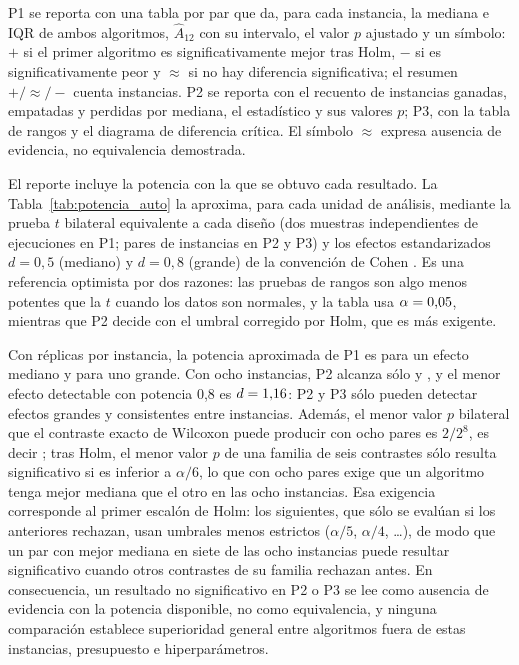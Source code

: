 P1 se reporta con una tabla por par que da, para cada instancia, la mediana e IQR de ambos algoritmos, $\hat{A}_{12}$ con su intervalo, el valor $p$ ajustado y un símbolo: $+$ si el primer algoritmo es significativamente mejor tras Holm, $-$ si es significativamente peor y $\approx$ si no hay diferencia significativa; el resumen $+/\approx/-$ cuenta instancias. P2 se reporta con el recuento de instancias ganadas, empatadas y perdidas por mediana, el estadístico y sus valores $p$; P3, con la tabla de rangos y el diagrama de diferencia crítica. El símbolo $\approx$ expresa ausencia de evidencia, no equivalencia demostrada.

El reporte incluye la potencia con la que se obtuvo cada resultado. La Tabla~\ref{tab:potencia_auto} la aproxima, para cada unidad de análisis, mediante la prueba $t$ bilateral equivalente a cada diseño (dos muestras independientes de \Replicates{} ejecuciones en P1; pares de instancias en P2 y P3) y los efectos estandarizados $d=0{,}5$ (mediano) y $d=0{,}8$ (grande) de la convención de Cohen \cite{Cohen1988Power}. Es una referencia optimista por dos razones: las pruebas de rangos son algo menos potentes que la $t$ cuando los datos son normales, y la tabla usa $\alpha=\text{0,05}$, mientras que P2 decide con el umbral corregido por Holm, que es más exigente.

\TablaPotenciaAuto

Con \Replicates{} réplicas por instancia, la potencia aproximada de P1 es \PowerReplicatesMedium{} para un efecto mediano y \PowerReplicatesLarge{} para uno grande. Con ocho instancias, P2 alcanza sólo \PowerInstancesMedium{} y \PowerInstancesLarge, y el menor efecto detectable con potencia 0,8 es $d=\text{1,16}$: P2 y P3 sólo pueden detectar efectos grandes y consistentes entre instancias. Además, el menor valor $p$ bilateral que el contraste exacto de Wilcoxon puede producir con ocho pares es $2/2^8$, es decir \WilcoxonMinP; tras Holm, el menor valor $p$ de una familia de seis contrastes sólo resulta significativo si es inferior a $\alpha/6$, lo que con ocho pares exige que un algoritmo tenga mejor mediana que el otro en las ocho instancias. Esa exigencia corresponde al primer escalón de Holm: los siguientes, que sólo se evalúan si los anteriores rechazan, usan umbrales menos estrictos ($\alpha/5$, $\alpha/4$, \ldots), de modo que un par con mejor mediana en siete de las ocho instancias puede resultar significativo cuando otros contrastes de su familia rechazan antes. En consecuencia, un resultado no significativo en P2 o P3 se lee como ausencia de evidencia con la potencia disponible, no como equivalencia, y ninguna comparación establece superioridad general entre algoritmos fuera de estas instancias, presupuesto e hiperparámetros.


